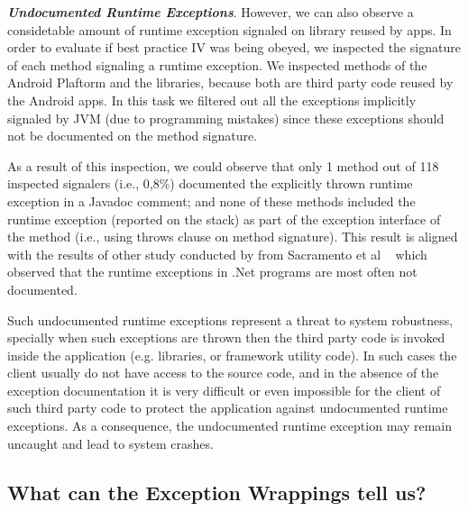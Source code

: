 \documentclass[conference]{IEEEtran}
\begin{document}
\emph{\textbf{Undocumented Runtime Exceptions}}.
However, we can also observe a considetable amount of 
runtime exception signaled on library reused by apps.
In order to evaluate if  best practice IV was being obeyed, we inspected the   
signature of each method signaling a runtime exception. 
We inspected methods of the Android Plaftorm and 
the libraries, because both are  third  party code reused 
by the Android apps. In this task we filtered out all the exceptions implicitly 
signaled by  JVM (due to programming mistakes) 
since these exceptions should not be documented on the 
method signature. 

As a result of this inspection, we could observe that only 1 method out of 118 inspected signalers
 (i.e., 0,8\%) documented the explicitly thrown runtime exception in a Javadoc comment; and none of these methods
included the runtime exception  (reported on the stack) as part of the exception interface of the method (i.e., using 
throws clause on method signature). This result is aligned with the results of other study conducted by from 
Sacramento et al ~\cite{sacramento2006unchecked} which observed that the
runtime exceptions in .Net programs are most often not documented.

Such undocumented runtime exceptions represent a threat to system robustness, specially
when such exceptions are thrown then the third party code is invoked inside the application 
(e.g. libraries, or framework utility code). In such cases the client usually do not have access to 
the source code, and in the absence of
the exception documentation it is very difficult or even impossible for the client of such third party code to 
protect the application against undocumented runtime exceptions. As a consequence, the
 undocumented runtime exception may remain uncaught and lead to system crashes.





\noindent {}

\subsection{What can the Exception Wrappings tell us?}
\end{document}
